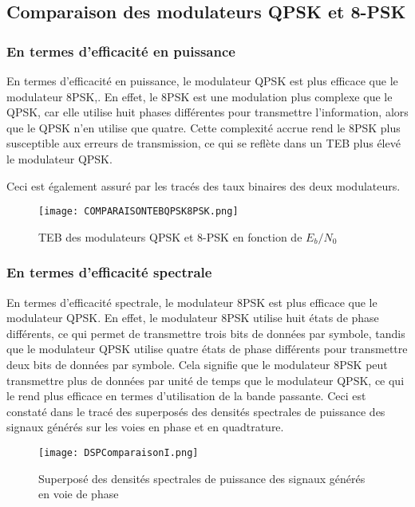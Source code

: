\documentclass[11pt]{article}
\begin{document}
\subsection{Comparaison des modulateurs QPSK et 8-PSK}
\subsubsection{En termes d'efficacité en puissance}
En termes d'efficacité en puissance, le modulateur QPSK est plus efficace que le modulateur 8PSK,. En effet, le 8PSK est une modulation plus complexe que le QPSK, car elle utilise huit phases différentes pour transmettre l'information, alors que le QPSK n'en utilise que quatre. Cette complexité accrue rend le 8PSK plus susceptible aux erreurs de transmission, ce qui se reflète dans un TEB plus élevé le modulateur QPSK.

Ceci est également assuré par les tracés des taux binaires des deux modulateurs.

\begin{figure}[ht!]
    \centering
    \texttt{[image: COMPARAISONTEBQPSK8PSK.png]}
    \caption{TEB des modulateurs QPSK et 8-PSK en fonction de $E_b/N_0$  \label{fig : TEB8PSKQPSK}}
\end{figure}

\subsubsection{En termes d'efficacité spectrale}

En termes d'efficacité spectrale, le modulateur 8PSK est plus efficace que le modulateur QPSK. En effet, le modulateur 8PSK utilise huit états de phase différents, ce qui permet de transmettre trois bits de données par symbole, tandis que le modulateur QPSK utilise quatre états de phase différents pour transmettre deux bits de données par symbole. Cela signifie que le modulateur 8PSK peut transmettre plus de données par unité de temps que le modulateur QPSK, ce qui le rend plus efficace en termes d'utilisation de la bande passante.
Ceci est constaté dans le tracé des superposés des densités spectrales de puissance des signaux générés sur les voies en phase et en quadtrature.

\begin{figure}[ht!]
    \centering
    \texttt{[image: DSPComparaisonI.png]}
    \caption{Superposé des densités spectrales de puissance des signaux générés en voie de phase \label{fig : ComparPhase}}
\end{figure}
\end{document}
